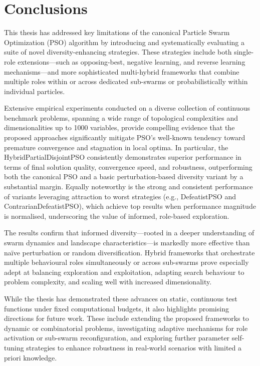\chapter[Conclusions]{Conclusions}
\label{cp:conclusions}


This thesis has addressed key limitations of the canonical Particle Swarm Optimization (PSO) algorithm by introducing and systematically evaluating a suite of novel diversity-enhancing strategies. These strategies include both single-role extensions---such as opposing-best, negative learning, and reverse learning mechanisms---and more sophisticated multi-hybrid frameworks that combine multiple roles within or across dedicated sub-swarms or probabilistically within individual particles.

Extensive empirical experiments conducted on a diverse collection of continuous benchmark problems, spanning a wide range of topological complexities and dimensionalities up to 1000 variables, provide compelling evidence that the proposed approaches significantly mitigate PSO’s well-known tendency toward premature convergence and stagnation in local optima. In particular, the HybridPartialDisjointPSO consistently demonstrates superior performance in terms of final solution quality, convergence speed, and robustness, outperforming both the canonical PSO and a basic perturbation-based diversity variant by a substantial margin. Equally noteworthy is the strong and consistent performance of variants leveraging attraction to worst strategies (e.g., DefeatistPSO and ContrarianDefeatistPSO), which achieve top results when performance magnitude is normalised, underscoring the value of informed, role-based exploration.

The results confirm that informed diversity---rooted in a deeper understanding of swarm dynamics and landscape characteristics---is markedly more effective than naïve perturbation or random diversification. Hybrid frameworks that orchestrate multiple behavioural roles simultaneously or across sub-swarms prove especially adept at balancing exploration and exploitation, adapting search behaviour to problem complexity, and scaling well with increased dimensionality.

While the thesis has demonstrated these advances on static, continuous test functions under fixed computational budgets, it also highlights promising directions for future work. These include extending the proposed frameworks to dynamic or combinatorial problems, investigating adaptive mechanisms for role activation or sub-swarm reconfiguration, and exploring further parameter self-tuning strategies to enhance robustness in real-world scenarios with limited a priori knowledge.


